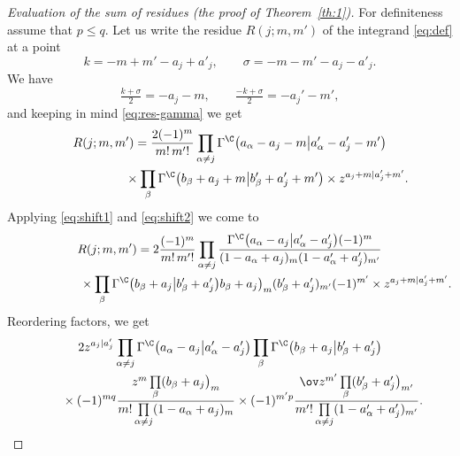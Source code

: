 \begin{proof}[Evaluation of the sum of residues (the proof of Theorem~\ref{th:1})]
For definiteness assume that $p\le q$.
Let us write the residue $R(j;m,m')$ of the integrand \eqref{eq:def}
at a point
\[
k= -m+m'-a_j+a'_j,\qquad \sigma=-m-m'-a_j-a'_j.
\]
We have
\[
\tfrac{k+\sigma}{2}=-a_j-m,\qquad \tfrac{-k+\sigma}{2}=-a_j'-m',
\]
and
keeping in mind \eqref{eq:res-gamma} we get
\begin{gather*}
R(j;m,m')=\frac{2(-1)^m}{m!\,m'!}
 \prod_{\alpha\ne j}
\Gamma^\C\big(a_\alpha-a_j-m\big|a_\alpha'-a_j'-m'\big)\\
\phantom{R(j;m,m')=}{} \times
\prod_{\beta} \Gamma^\C\big(b_\beta+a_j+m\big|b_\beta'+a_j'+m'\big)
\times z^{a_j+m|a_j'+m'}.
\end{gather*}
Applying \eqref{eq:shift1} and \eqref{eq:shift2} we come to
\begin{gather*}
R(j;m,m')=2 \frac{(-1)^m}{m!\,m'!}
\prod_{\alpha\ne j} \frac{\Gamma^\C\big(
a_\alpha-a_j\big|a_\alpha'-a_j'\big)(-1)^{m}}
{(1-a_\alpha+a_j)_m(1-a_\alpha'+a_j')_{m'}} \\
\hphantom{R(j;m,m')=}{} \times
\prod_{\beta} \Gamma^\C\big(b_\beta+a_j\big|b_\beta'+a_j'\big)
b_\beta+a_j\big)_m(b_\beta'+a_j')_{m'} (-1)^{m'}
\times z^{a_j+m|a_j'+m'}.
\end{gather*}
Reordering factors, we get
\begin{gather*}
2 z^{a_j|a'_j}
\prod_{\alpha\ne j} \Gamma^\C\big(a_\alpha-a_j\big|a_\alpha'-a_j'\big)
\prod_{\beta}
\Gamma^\C\big(b_\beta+a_j\big|b_\beta'+a_j'\big) \\
\qquad{}\times
(-1)^{mq} \frac{z^m \prod\limits_{\beta}(b_\beta+a_j\big)_{m}}
{m!\prod\limits_{\alpha\ne j} (1-a_\alpha+a_j)_{m}}
 \times
(-1)^{m'p} \frac{\ov z^{m'} \prod\limits_{\beta}(b_\beta'+a_j'\big)_{m'}}
{m'!\prod\limits_{\alpha\ne j} (1-a_\alpha'+a_j')_{m'}}.
\end{gather*}


\end{proof}

